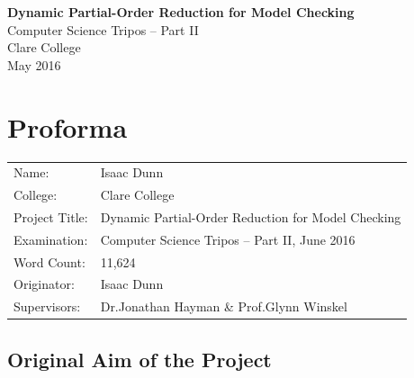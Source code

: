 \documentclass[12pt,a4paper,twoside,openany]{report}
\begin{document}




\thispagestyle{empty}


\vspace*{60mm}
\begin{center}
\Huge
\textbf{Dynamic Partial-Order Reduction for Model Checking} \\[7mm]
Computer Science Tripos -- Part II \\[6mm]
Clare College \\[7mm]
\LARGE May 2016  %
\end{center}


\pagestyle{plain}

\chapter*{Proforma}

{\large
\begin{tabular}{ll}
Name:           &  Isaac Dunn                            			 \\
College:        &  Clare College                    				     \\
Project Title:	&  Dynamic Partial-Order Reduction for Model Checking \\
Examination:    &  Computer Science Tripos -- Part II, June 2016      \\
Word Count:     &  11,624\footnotemark[1]					 \\
Originator: &  Isaac Dunn\footnotemark[2] 					 \\
Supervisors:	&  Dr.\@ Jonathan Hayman \& Prof.\@ Glynn Winskel         \\
\end{tabular}
}


\section*{Original Aim of the Project}
\end{document}
